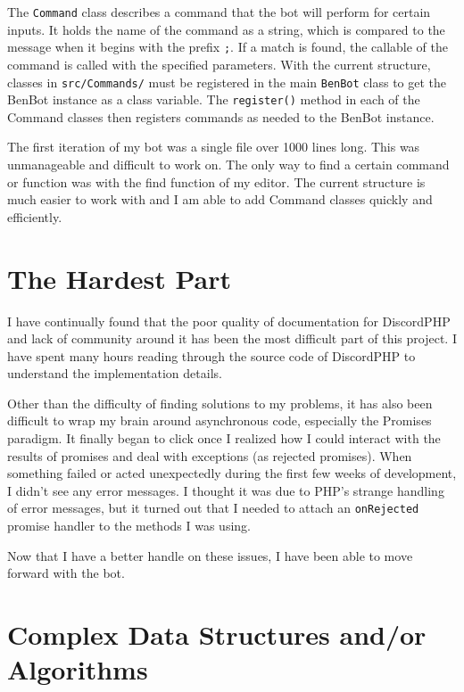 \documentclass[12pt]{article} %
\begin{document}
The \verb|Command| class describes a command that the bot will perform for certain inputs. It holds the name of the command as a string, which is compared to the message when it begins with the prefix \verb|;|. If a match is found, the callable of the command is called with the specified parameters. With the current structure, classes in \verb|src/Commands/| must be registered in the main \verb|BenBot| class to get the BenBot instance as a class variable. The \verb|register()| method in each of the Command classes then registers commands as needed to the BenBot instance.

The first iteration of my bot was a single file over 1000 lines long. This was unmanageable and difficult to work on. The only way to find a certain command or function was with the find function of my editor. The current structure is much easier to work with and I am able to add Command classes quickly and efficiently.


\section{The Hardest Part}

I have continually found that the poor quality of documentation for DiscordPHP and lack of community around it has been the most difficult part of this project. I have spent many hours reading through the source code of DiscordPHP to understand the implementation details.

Other than the difficulty of finding solutions to my problems, it has also been difficult to wrap my brain around asynchronous code, especially the Promises paradigm. It finally began to click once I realized how I could interact with the results of promises and deal with exceptions (as rejected promises). When something failed or acted unexpectedly during the first few weeks of development, I didn't see any error messages. I thought it was due to PHP's strange handling of error messages, but it turned out that I needed to attach an \verb|onRejected| promise handler to the methods I was using.

Now that I have a better handle on these issues, I have been able to move forward with the bot.


\section{Complex Data Structures and/or Algorithms}
\end{document}

